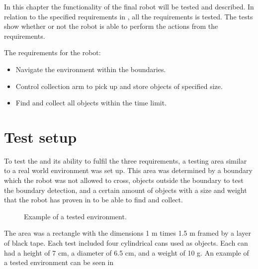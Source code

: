 In this chapter the functionality of the final robot will be tested and described. In relation to the specified requirements in , all the requirements is tested. The tests show whether or not the robot is able to perform the actions from the requirements.

The requirements for the robot: 
\begin{itemize}
\item Navigate the environment within the boundaries.
\item Control collection arm to pick up and store objects of specified size.
\item Find and collect all objects within the time limit.
\end{itemize}

\section{Test setup}

To test the \projname{} and its ability to fulfil the three requirements, a testing area similar to a real world environment was set up. This area was determined by a boundary which the robot was not allowed to cross, objects outside the boundary to test the boundary detection, and a certain amount of objects with a size and weight that the robot has proven in  to be able to find and collect.

\begin{figure}[H]
     \caption{\label{fig:test-setup} Example of a tested environment.}
\end{figure}

The area was a rectangle with the dimensions 1 m times 1.5 m framed by a layer of black tape. Each test included four cylindrical cans used as objects. Each can had a height of 7 cm, a diameter of 6.5 cm, and a weight of 10 g. An example of a tested environment can be seen in 

